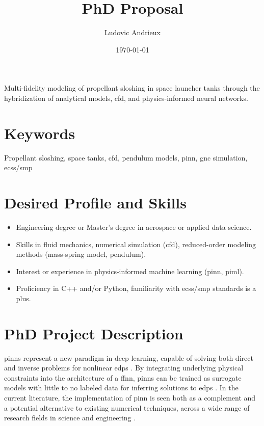 \documentclass[12pt]{article}
\title{PhD Proposal}
\author{Ludovic Andrieux}
\date{\today}
\begin{document}
	\maketitle
	
	\begin{tcolorbox}[colback=gray!0, colframe=black, sharp corners, boxrule=0.5pt]
		Multi-fidelity modeling of propellant sloshing in space launcher tanks through the hybridization of analytical models, \acrshort{cfd}, and physics-informed neural networks.
	\end{tcolorbox}
	
	\section*{Keywords}
	
	Propellant sloshing, space tanks, \acrshort{cfd}, pendulum models, \acrshort{pinn}, \acrshort{gnc} simulation, \acrshort{ecss}/\acrshort{smp}
	
	\section*{Desired Profile and Skills}
	
	\begin{itemize}
		\item Engineering degree or Master's degree in aerospace or applied data science.
		
		\item Skills in fluid mechanics, numerical simulation (\acrshort{cfd}), reduced-order modeling methods (mass-spring model, pendulum).
		
		\item Interest or experience in physics-informed machine learning (\acrshort{pinn}, \acrshort{piml}).
		
		\item Proficiency in C++ and/or Python, familiarity with \acrshort{ecss}/\acrshort{smp} standards is a plus.
	\end{itemize}
	
	\section*{PhD Project Description}
	
	\gls{pinn}s represent a new paradigm in deep learning, capable of solving both direct and inverse problems for nonlinear \gls{edp}s \cite{raissiPhysicsinformedNeuralNetworks2019}. By integrating underlying physical constraints into the architecture of a \gls{ffnn}, \gls{pinn}s can be trained as surrogate models with little to no labeled data for inferring solutions to \gls{edp}s \cite{cuomoScientificMachineLearning2022}. In the current literature, the implementation of \gls{pinn} is seen both as a complement and a potential alternative to existing numerical techniques, across a wide range of research fields in science and engineering \cite{maoPhysicsinformedNeuralNetworks2020, buosoPersonalisingLeftventricularBiophysical2021, caiPhysicsInformedNeuralNetworks2021}.
	
\end{document}
